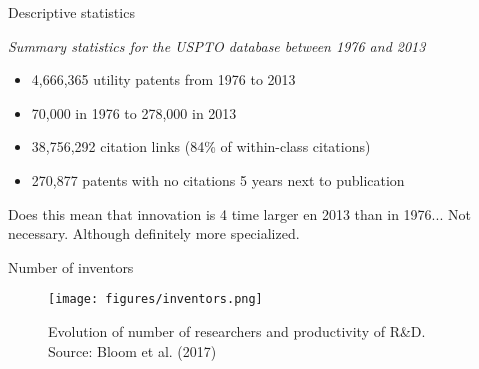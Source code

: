 \documentclass{beamer}
\begin{document}
\begin{frame}{Descriptive statistics}
    
    
    \textit{Summary statistics for the USPTO database between 1976 and 2013}
    
    \begin{itemize}
        \item 4,666,365 utility patents from 1976 to 2013
        \item 70,000 in 1976 to 278,000 in 2013
        \item 38,756,292 citation links (84\% of within-class citations)
        \item 270,877 patents with no citations 5 years next to publication
    \end{itemize}
    
    Does this mean that innovation is 4 time larger en 2013 than in 1976... \alert{Not necessary}. Although definitely more specialized.
\end{frame}
\begin{frame}{Number of inventors}
    \begin{figure}
        \centering
        \texttt{[image: figures/inventors.png]}
        \caption{Evolution of number of researchers and productivity of R\&D. Source: Bloom et al. (2017)}
    \end{figure}
\end{frame}
\end{document}
